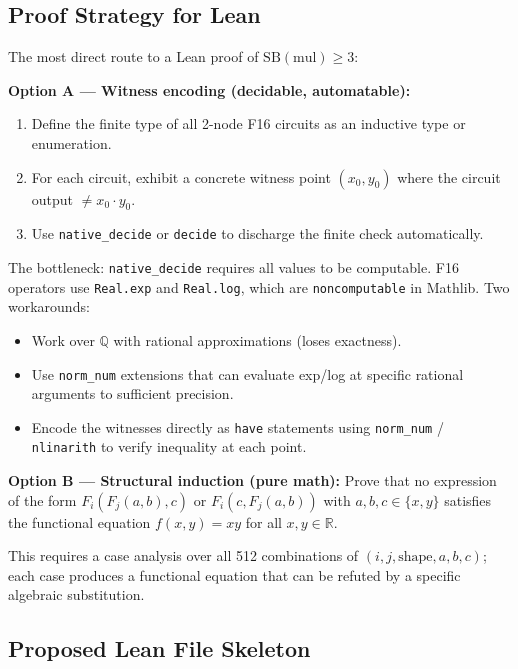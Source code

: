 \documentclass[12pt]{article}
\theoremstyle{definition}
\begin{document}
\subsection{Proof Strategy for Lean}

The most direct route to a Lean proof of $\mathrm{SB}(\mathrm{mul}) \geq 3$:

\textbf{Option A — Witness encoding (decidable, automatable):}
\begin{enumerate}
  \item Define the finite type of all 2-node F16 circuits as an inductive type
    or enumeration.
  \item For each circuit, exhibit a concrete witness point $(x_0, y_0)$ where
    the circuit output $\neq x_0 \cdot y_0$.
  \item Use \texttt{native\_decide} or \texttt{decide} to discharge the
    finite check automatically.
\end{enumerate}

The bottleneck: \texttt{native\_decide} requires all values to be computable.
F16 operators use \texttt{Real.exp} and \texttt{Real.log}, which are
\texttt{noncomputable} in Mathlib.  Two workarounds:
\begin{itemize}
  \item Work over $\mathbb{Q}$ with rational approximations (loses exactness).
  \item Use \texttt{norm\_num} extensions that can evaluate exp/log at specific
    rational arguments to sufficient precision.
  \item Encode the witnesses directly as \texttt{have} statements using
    \texttt{norm\_num} / \texttt{nlinarith} to verify inequality at each point.
\end{itemize}

\textbf{Option B — Structural induction (pure math):}
Prove that no expression of the form $F_i(F_j(a, b), c)$ or $F_i(c, F_j(a, b))$
with $a, b, c \in \{x, y\}$ satisfies the functional equation $f(x, y) = xy$
for all $x, y \in \mathbb{R}$.

This requires a case analysis over all 512 combinations of $(i, j, \mathrm{shape},
a, b, c)$; each case produces a functional equation that can be refuted by a
specific algebraic substitution.

\subsection{Proposed Lean File Skeleton}
\end{document}
